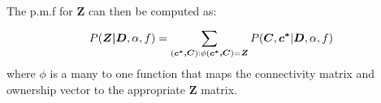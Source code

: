 \noindent
The p.m.f for $\bm Z$ can then be computed as:
\begin{equation}
  P(\bm{Z|D},\alpha,f) = \sum\limits_{(\bm{c^*,C}):\phi(\bm{c^*,C})=\bm Z}^{} 
                         P(\bm C, \bm{c^*}|\bm D,\alpha,f)
\end{equation}
where $\phi$ is a many to one function that maps the connectivity matrix and
ownership vector to the appropriate $\bm Z$ matrix.




